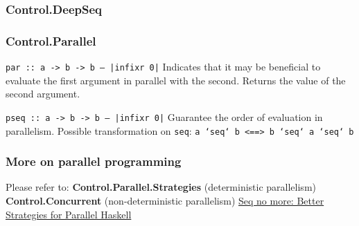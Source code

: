 \documentclass{beamer}
\newcommand{\inlinehaskell}[1]{\texttt{#1}}
\begin{document}


\begin{frame}
\frametitle{Control.DeepSeq}
\end{frame}


\begin{frame}
\frametitle{Control.Parallel}
\inlinehaskell{par :: a -> b -> b  -- |infixr 0|}\newline
Indicates that it may be beneficial to evaluate the first argument in parallel with the second. Returns the value of the second argument.\newline

\inlinehaskell{pseq :: a -> b -> b   -- |infixr 0|}\newline
Guarantee the order of evaluation in parallelism.\newline
\newline\pause
Possible transformation on \inlinehaskell{seq}:\newline
\inlinehaskell{a `seq` b <==> b `seq` a `seq` b}
\end{frame}


\begin{frame}
\frametitle{More on parallel programming}
Please refer to:\newline\newline
\textbf{Control.Parallel.Strategies} (deterministic parallelism)\newline\newline
\textbf{Control.Concurrent} (non-deterministic parallelism)\newline\newline
\href{http://simonmar.github.io/bib/papers/strategies.pdf}{Seq no more: Better Strategies for Parallel Haskell}
\end{frame}
\end{document}

